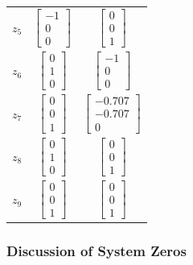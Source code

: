 \begin{table}[H]
\begin{tabular}{ccc}
		$z_5$            &$ \begin{bmatrix} -1 \\ 0 \\ 0\end{bmatrix} $ & $ \begin{bmatrix} 0 \\ 0 \\ 1\end{bmatrix} $ \\
		$z_6$            &$ \begin{bmatrix} 0 \\ 1 \\ 0\end{bmatrix} $ & $ \begin{bmatrix} -1 \\ 0 \\ 0\end{bmatrix} $ \\
		$z_7$            &$ \begin{bmatrix} 0 \\ 0 \\ 1\end{bmatrix} $ & $ \begin{bmatrix} -0.707 \\ -0.707 \\ 0\end{bmatrix} $ \\
		$z_8$            &$ \begin{bmatrix} 0 \\ 1 \\ 0\end{bmatrix} $ & $ \begin{bmatrix} 0 \\ 0 \\ 1\end{bmatrix} $ \\
		$z_9$            &$ \begin{bmatrix} 0 \\ 0 \\ 1\end{bmatrix} $ & $ \begin{bmatrix} 0 \\ 0 \\ 1\end{bmatrix} $ \\\hline             
	\end{tabular}
	\label{tab: Zero Directions of system}
\end{table}

\subsubsection{Discussion of System Zeros}


